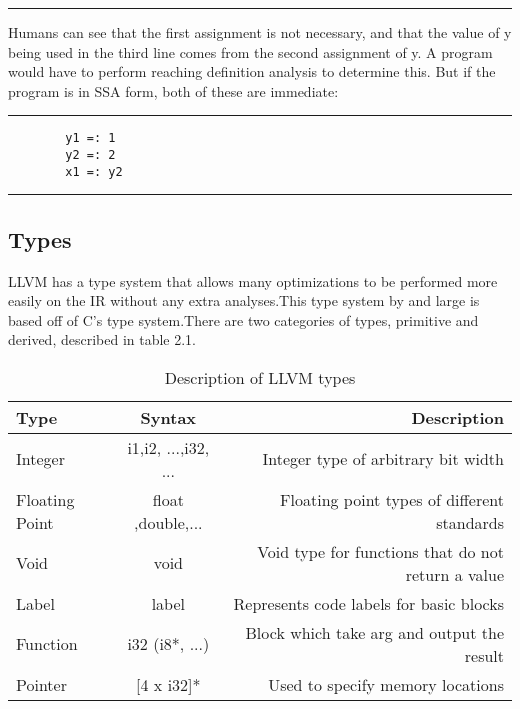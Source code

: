 \documentclass[openany]{book}
\begin{document}
    \noindent\rule{12cm}{0.4pt} \linebreak
	
	Humans can see that the first assignment is not necessary, and that the value of y being used in the third line comes from the second assignment of y. A program would have to perform reaching definition analysis to determine this. But if the program is in SSA form, both of these are immediate: \newline
	
    \noindent\rule{12cm}{0.4pt}
	
	\begin{verbatim}
		y1 =: 1
		y2 =: 2
		x1 =: y2
	\end{verbatim}

    \noindent\rule{12cm}{0.4pt} \linebreak
    
    \subsection{Types}
    
    LLVM has a type system that allows many optimizations to be performed more easily on the IR without any extra analyses.This type system by and large is based off of C's type system.There are two categories of types, primitive and derived, described in table 2.1.\newline
    
   
    \begin{table}[h!]
    	\begin{center}
    		\label{tab:Table 2.1.}
    		\begin{tabular}{l|c|r} 
    			\hline
    			\textbf{Type} & \textbf{Syntax} & \textbf{Description}\\
    			\hline
    			Integer & i1,i2, ...,i32, ... & Integer type of arbitrary bit width\\
    			Floating Point & float ,double,... & Floating point types of different standards \\
    			Void & void & Void type for functions that do not return a value \\
    			Label & label & Represents code labels for basic blocks \\
    			\hline
    			Function & i32 (i8*, ...) & Block which take arg and output the result\\
    			Pointer & [4 x i32]* & Used to specify memory locations\\
    			\hline
    		\end{tabular}
    		\caption{Description of LLVM types}
    	\end{center}
    \end{table}
\end{document}
